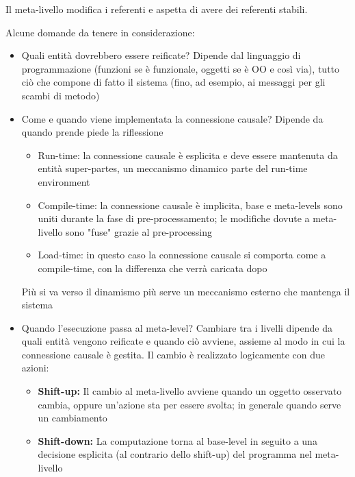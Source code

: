 Il meta-livello modifica i referenti e aspetta di avere dei referenti stabili.

Alcune domande da tenere in considerazione:
\begin{itemize}
	\item Quali entità dovrebbero essere reificate? Dipende dal linguaggio di programmazione (funzioni se è funzionale, oggetti se è OO e così via), tutto ciò che compone di fatto il sistema (fino, ad esempio, ai messaggi per gli scambi di metodo)
	
	\item Come e quando viene implementata la connessione causale? Dipende da quando prende piede la riflessione
	\begin{itemize}
		\item Run-time: la connessione causale è esplicita e deve essere mantenuta da entità super-partes, un meccanismo dinamico parte del run-time environment
		
		\item Compile-time: la connessione causale è implicita, base e meta-levels sono uniti durante la fase di pre-processamento; le modifiche dovute a meta-livello sono "fuse" grazie al pre-processing
		
		\item Load-time: in questo caso la connessione causale si comporta come a compile-time, con la differenza che verrà caricata dopo
	\end{itemize}
	Più si va verso il dinamismo più serve un meccanismo esterno che mantenga il sistema
	
	\item Quando l'esecuzione passa al meta-level? Cambiare tra i livelli dipende da quali entità vengono reificate e quando ciò avviene, assieme al modo in cui la connessione causale è gestita. Il cambio è realizzato logicamente con due azioni: 
	\begin{itemize}
		\item \textbf{Shift-up:} Il cambio al meta-livello avviene quando un oggetto osservato cambia, oppure un'azione sta per essere svolta; in generale quando serve un cambiamento
		
		\item \textbf{Shift-down:} La computazione torna al base-level in seguito a una decisione esplicita (al contrario dello shift-up) del programma nel meta-livello
	\end{itemize}
\end{itemize}


